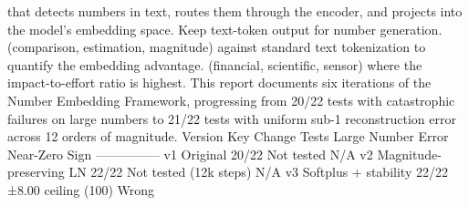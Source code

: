 \markdownRendererUlEndTight \markdownRendererInterblockSeparator
{}
\markdownRendererSectionEnd \markdownRendererSectionBegin
{}\markdownRendererInterblockSeparator
{}\markdownRendererUlBeginTight
\markdownRendererUlItem {} that detects numbers in text, routes them through the encoder, and projects into the model's embedding space. Keep text-token output for number generation.\markdownRendererUlItemEnd 
\markdownRendererUlItem {} (comparison, estimation, magnitude) against standard text tokenization to quantify the embedding advantage.\markdownRendererUlItemEnd 
\markdownRendererUlItem {} (financial, scientific, sensor) where the impact-to-effort ratio is highest.\markdownRendererUlItemEnd 
\markdownRendererUlEndTight \markdownRendererInterblockSeparator
{}\markdownRendererThematicBreak{}\markdownRendererInterblockSeparator
{}
\markdownRendererSectionEnd 
\markdownRendererSectionEnd \markdownRendererSectionBegin
{}\markdownRendererInterblockSeparator
{}This report documents six iterations of the Number Embedding Framework, progressing from 20/22 tests with catastrophic failures on large numbers to 21/22 tests with uniform sub-1\markdownRendererPercentSign{} reconstruction error across 12 orders of magnitude.\markdownRendererInterblockSeparator
{}\markdownRendererSectionBegin
{}\markdownRendererInterblockSeparator
{}\markdownRendererPipe{} Version \markdownRendererPipe{} Key Change \markdownRendererPipe{} Tests \markdownRendererPipe{} Large Number Error \markdownRendererPipe{} Near-Zero Sign \markdownRendererPipe{}\markdownRendererSoftLineBreak
{}\markdownRendererPipe{}---\markdownRendererPipe{}---\markdownRendererPipe{}---\markdownRendererPipe{}---\markdownRendererPipe{}---\markdownRendererPipe{}\markdownRendererSoftLineBreak
{}\markdownRendererPipe{} v1 \markdownRendererPipe{} Original \markdownRendererPipe{} 20/22 \markdownRendererPipe{} Not tested \markdownRendererPipe{} N/A \markdownRendererPipe{}\markdownRendererSoftLineBreak
{}\markdownRendererPipe{} v2 \markdownRendererPipe{} Magnitude-preserving LN \markdownRendererPipe{} 22/22 \markdownRendererPipe{} Not tested (12k steps) \markdownRendererPipe{} N/A \markdownRendererPipe{}\markdownRendererSoftLineBreak
{}\markdownRendererPipe{} v3 \markdownRendererPipe{} Softplus + stability \markdownRendererPipe{} 22/22 \markdownRendererPipe{} ±8.00 ceiling (100\markdownRendererPercentSign{}) \markdownRendererPipe{} Wrong \markdownRendererPipe{}\markdownRendererSoftLineBreak
